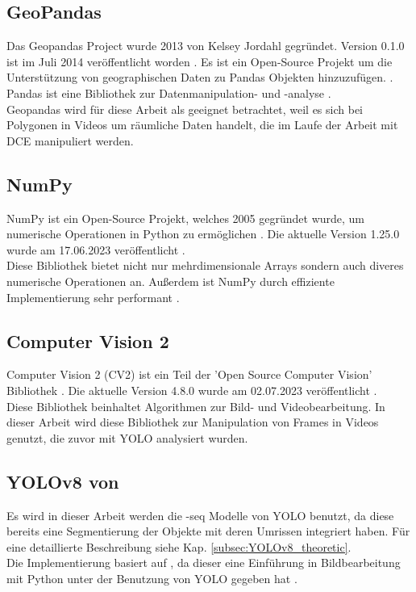 		\subsection{GeoPandas}
		{ \label{subsec:Geopandas}
			Das Geopandas Project wurde 2013 von Kelsey Jordahl gegründet. Version 0.1.0 ist im Juli 2014 veröffentlicht worden . Es ist ein Open-Source Projekt um die Unterstützung von geographischen Daten zu Pandas Objekten hinzuzufügen. \citep{kelsey_jordahl_2020_3946761}. Pandas ist eine Bibliothek zur Datenmanipulation- und -analyse \citep{reback2020pandas}.  \\
			Geopandas wird für diese Arbeit als geeignet betrachtet, weil es sich bei Polygonen in Videos um räumliche Daten handelt, die im Laufe der Arbeit mit DCE manipuliert werden.
		}
		\subsection{NumPy}
		{ \label{subsec:NumPy}
		NumPy ist ein Open-Source Projekt, welches 2005 gegründet wurde, um numerische Operationen in Python zu ermöglichen \citep{numpy_about}. Die aktuelle Version 1.25.0 wurde am 17.06.2023 veröffentlicht \citep{numpy_main_web}. \\
		Diese Bibliothek bietet nicht nur mehrdimensionale Arrays sondern auch diveres numerische Operationen an. Außerdem ist NumPy durch effiziente Implementierung sehr performant \citep{numpy_main_web}. \\
		}
		\subsection{Computer Vision 2}
		{ \label{subsec:Computer_Vision_2}
		Computer Vision 2 (CV2) ist ein Teil der 'Open Source Computer Vision' Bibliothek \citep{opencv_about}. Die aktuelle Version 4.8.0 wurde am 02.07.2023 veröffentlicht \citep{opencv_release}. \\
		Diese Bibliothek beinhaltet Algorithmen zur Bild- und Videobearbeitung. In dieser Arbeit wird diese Bibliothek zur Manipulation von Frames in Videos genutzt, die zuvor mit YOLO analysiert wurden. 
		}
		\subsection{YOLOv8 von \citeauthor{Canu_pysource}}
		{ \label{YOLOv8_canu}
		Es wird in dieser Arbeit werden die \glqq-seq\grqq{} Modelle von YOLO benutzt, da diese bereits eine Segmentierung der Objekte mit deren Umrissen integriert haben. Für eine detaillierte Beschreibung siehe Kap. \ref{subsec:YOLOv8_theoretic}. \\
		Die Implementierung basiert auf \citeauthor{Canu_pysource}, da dieser eine Einführung in Bildbearbeitung mit Python unter der Benutzung von YOLO gegeben hat \citep{Canu_pysource}.
		}
